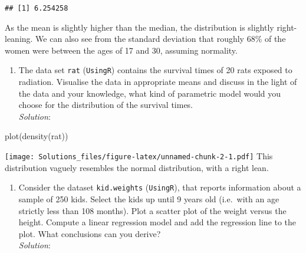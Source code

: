 \documentclass[
]{article}
\newenvironment{Shaded}{\begin{snugshade}}{\end{snugshade}}
\newcommand{\DecValTok}[1]{\textcolor[rgb]{0.00,0.00,0.81}{#1}}
\newcommand{\FunctionTok}[1]{\textcolor[rgb]{0.00,0.00,0.00}{#1}}
\newcommand{\NormalTok}[1]{#1}
\newcommand{\OtherTok}[1]{\textcolor[rgb]{0.56,0.35,0.01}{#1}}
\newcommand{\SpecialCharTok}[1]{\textcolor[rgb]{0.00,0.00,0.00}{#1}}
\providecommand{\tightlist}{%
  \setlength{\itemsep}{0pt}\setlength{\parskip}{0pt}}
\begin{document}
\begin{verbatim}
## [1] 6.254258
\end{verbatim}

As the mean is slightly higher than the median, the distribution is
slightly right-leaning. We can also see from the standard deviation that
roughly 68\% of the women were between the ages of 17 and 30, assuming
normality.

\begin{enumerate}
\def\labelenumi{(\alph{enumi})}
\setcounter{enumi}{1}
\tightlist
\item
  The data set \texttt{rat} (\texttt{UsingR}) contains the survival
  times of 20 rats exposed to radiation. Visualise the data in
  appropriate means and discuss in the light of the data and your
  knowledge, what kind of parametric model would you choose for the
  distribution of the survival times.\\
  \emph{Solution}:
\end{enumerate}

\begin{Shaded}
\begin{Highlighting}[]
\FunctionTok{plot}\NormalTok{(}\FunctionTok{density}\NormalTok{(rat))}
\end{Highlighting}
\end{Shaded}

\texttt{[image: Solutions\_files/figure-latex/unnamed-chunk-2-1.pdf]}
This distribution vaguely resembles the normal distribution, with a
right lean.

\begin{enumerate}
\def\labelenumi{(\alph{enumi})}
\setcounter{enumi}{2}
\tightlist
\item
  Consider the dataset \texttt{kid.weights} (\texttt{UsingR}), that
  reports information about a sample of 250 kids. Select the kids up
  until 9 years old (i.e.~with an age strictly less than 108 months).
  Plot a scatter plot of the weight versus the height. Compute a linear
  regression model and add the regression line to the plot. What
  conclusions can you derive?\\
  \emph{Solution}:
\end{enumerate}

\begin{Shaded}
\end{Shaded}
\end{document}
